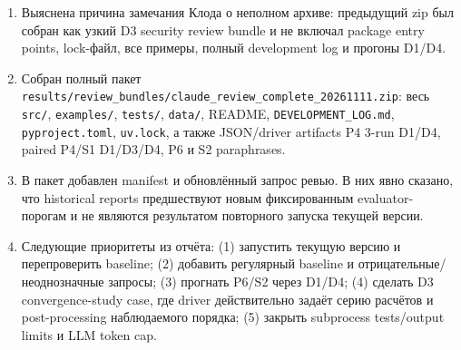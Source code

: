 \documentclass[11pt,a4paper]{article}
\begin{document}
\begin{enumerate}
    \item Выяснена причина замечания Клода о неполном архиве: предыдущий zip был собран как узкий D3 security review bundle и не включал package entry points, lock-файл, все примеры, полный development log и прогоны D1/D4.
    \item Собран полный пакет \texttt{results/review\_bundles/claude\_review\_complete\_20261111.zip}: весь \texttt{src/}, \texttt{examples/}, \texttt{tests/}, \texttt{data/}, README, \texttt{DEVELOPMENT\_LOG.md}, \texttt{pyproject.toml}, \texttt{uv.lock}, а также JSON/driver artifacts P4 3-run D1/D4, paired P4/S1 D1/D3/D4, P6 и S2 paraphrases.
    \item В пакет добавлен manifest и обновлённый запрос ревью. В них явно сказано, что historical reports предшествуют новым фиксированным evaluator-порогам и не являются результатом повторного запуска текущей версии.
    \item Следующие приоритеты из отчёта: (1) запустить текущую версию и перепроверить baseline; (2) добавить регулярный baseline и отрицательные/неоднозначные запросы; (3) прогнать P6/S2 через D1/D4; (4) сделать D3 convergence-study case, где driver действительно задаёт серию расчётов и post-processing наблюдаемого порядка; (5) закрыть subprocess tests/output limits и LLM token cap.
\end{enumerate}
\end{document}

